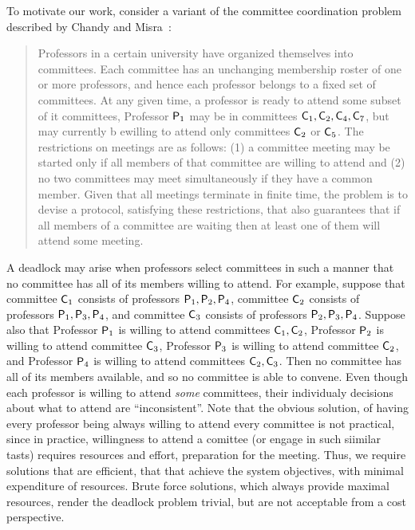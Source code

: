 To motivate our work, consider a variant of 
the committee coordination problem described by Chandy and Misra~\cite{MisraCommittee}:
\begin{quote}
  Professors in a certain university have organized themselves into committees.  Each committee has an unchanging membership roster of one or more
  professors, and hence each professor belongs to a fixed set of committees.
At any given time, a professor is ready to attend some subset of it committees, \eg Professor $\mathsf{P}_1$ may be in committees $\mathsf{C}_1, \mathsf{C}_2, \mathsf{C}_4, \mathsf{C}_7$, but may
currently b ewilling to attend only committees $\mathsf{C}_2$ or $\mathsf{C}_5$.
The restrictions on meetings are as follows: (1) a committee meeting may be started only if all
  members of that committee are willing to attend and (2) no two committees may meet simultaneously if they have a common member.  Given that all meetings
  terminate in finite time, the problem is to devise a protocol, satisfying these restrictions, that also guarantees that if all members of a
  committee are waiting then at least one of them will attend some meeting.
\end{quote}
A deadlock may arise when professors select committees in such a manner that no committee has all of its members willing to attend.  
%
For example, suppose that 
committee $\mathsf{C}_1$ consists of professors $\mathsf{P}_1, \mathsf{P}_2, \mathsf{P}_4$, 
committee $\mathsf{C}_2$ consists of professors $\mathsf{P}_1, \mathsf{P}_3, \mathsf{P}_4$, and 
committee $\mathsf{C}_3$ consists of professors $\mathsf{P}_2, \mathsf{P}_3, \mathsf{P}_4$.
%
Suppose also that 
Professor $\mathsf{P}_1$ is willing to attend committees $\mathsf{C}_1, \mathsf{C}_2$, 
Professor $\mathsf{P}_2$ is willing to attend committee $\mathsf{C}_3$, %
Professor $\mathsf{P}_3$ is willing to attend committee $\mathsf{C}_2$, and %
Professor $\mathsf{P}_4$ is willing to attend committees $\mathsf{C}_2, \mathsf{C}_3$. %
%
Then no committee has all of its members available, and so no committee is able to convene. 
Even though each professor is willing to attend \emph{some} committees, their individualy decisions about what to attend are 
``inconsistent''. 
Note that the obvious solution, of having every professor being always willing to attend every committee is not practical, since in practice,
willingness to attend a comittee (or engage in such siimilar tasts) requires resources and effort, \eg preparation for the meeting. 
Thus, we require solutions that are efficient, that that achieve the system objectives, with minimal expenditure of resources. 
Brute force solutions, which always provide maximal resources, render the deadlock problem trivial, but are not acceptable from a cost perspective.



